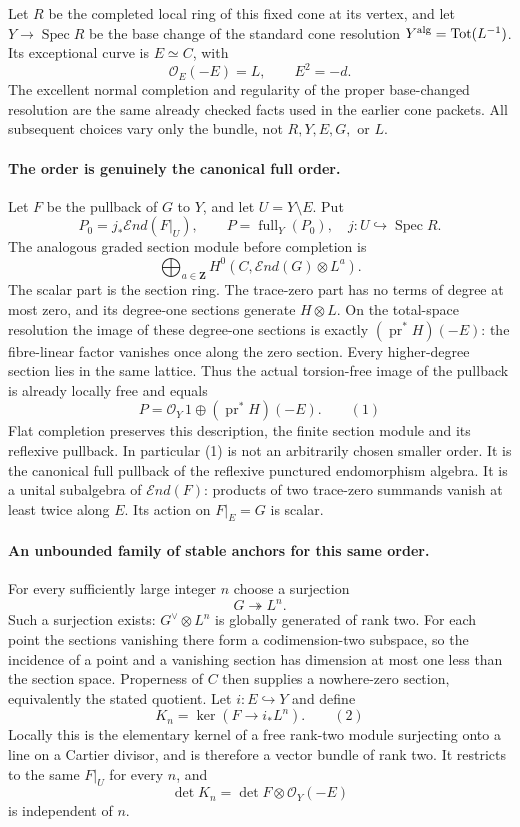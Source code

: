 Let $R$ be the completed local ring of this fixed cone at its
vertex, and let $Y\to\operatorname{Spec}R$ be the base change of
the standard cone resolution
$Y^{\rm alg}=\operatorname{Tot}(L^{-1})$. Its exceptional curve
is $E\simeq C$, with
\[
 \mathcal O_E(-E)=L,\qquad E^2=-d.
\]
The excellent normal completion and regularity of the proper
base-changed resolution are the same already checked facts used
in the earlier cone packets. All subsequent choices vary only
the bundle, not $R,Y,E,G,$ or $L$.

\paragraph{The order is genuinely the canonical full order.}
Let $F$ be the pullback of $G$ to $Y$, and let $U=Y\setminus E$.
Put
\[
 P_0=j_*\mathcal End(F|_U),\qquad
 P=\operatorname{full}_Y(P_0),
 \quad j:U\hookrightarrow\operatorname{Spec}R.
\]
The analogous graded section module before completion is
\[
 \bigoplus_{a\in\mathbf Z}
       H^0(C,\mathcal End(G)\otimes L^a).
\]
The scalar part is the section ring. The trace-zero part has
no terms of degree at most zero, and its degree-one sections
generate $H\otimes L$. On the total-space resolution the
image of these degree-one sections is exactly
$(\operatorname{pr}^*H)(-E)$: the fibre-linear factor vanishes
once along the zero section. Every higher-degree section lies
in the same lattice. Thus the actual torsion-free image of
the pullback is already locally free and equals
\[
       P=\mathcal O_Y\,1\oplus(\operatorname{pr}^*H)(-E).
                                                        \qquad(1)
\]
Flat completion preserves this description, the finite section
module and its reflexive pullback. In particular (1) is not an
arbitrarily chosen smaller order. It is the canonical full
pullback of the reflexive punctured endomorphism algebra.
It is a unital subalgebra of $\mathcal End(F)$: products of
two trace-zero summands vanish at least twice along $E$.
Its action on $F|_E=G$ is scalar.

\paragraph{An unbounded family of stable anchors for this same order.}
For every sufficiently large integer $n$ choose a surjection
\[
                       G\twoheadrightarrow L^n.

\]
Such a surjection exists: $G^\vee\otimes L^n$ is globally
generated of rank two. For each point the sections vanishing
there form a codimension-two subspace, so the incidence of a
point and a vanishing section has dimension at most one less
than the section space. Properness of $C$ then supplies a
nowhere-zero section, equivalently the stated quotient.
Let $i:E\hookrightarrow Y$ and define
\[
              K_n=\ker(F\longrightarrow i_*L^n).
                                                        \qquad(2)
\]
Locally this is the elementary kernel of a free rank-two
module surjecting onto a line on a Cartier divisor, and is
therefore a vector bundle of rank two. It restricts to the
same $F|_U$ for every $n$, and
\[
                \det K_n=\det F\otimes\mathcal O_Y(-E)

\]
is independent of $n$.

